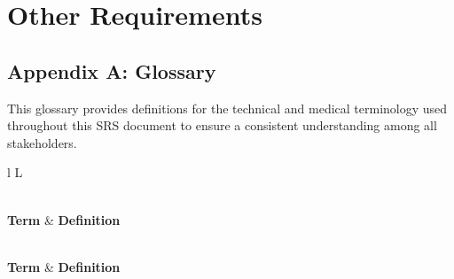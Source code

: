 \section{Other Requirements}

\subsection{Appendix A: Glossary}

This glossary provides definitions for the technical and medical terminology used throughout this SRS document to ensure a consistent understanding among all stakeholders.

\keepXColumns 
\begin{tabularx}{\textwidth}{l L}
	\caption{Glossary of Terms and Abbreviations} \label{tab:glossary} \\
	
	\toprule
	\textbf{Term} & \textbf{Definition} \\
	\midrule
	\endfirsthead
	
	 \\
	\toprule
	\textbf{Term} & \textbf{Definition} \\
	\midrule
	\endhead
	
	\bottomrule
	\endfoot
	

\end{tabularx}
